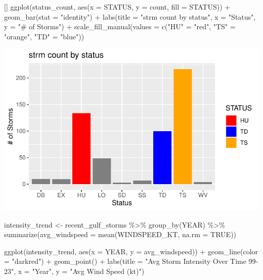\documentclass[12pt,letterpaper]{article}
\newenvironment{Shaded}{\begin{snugshade}}{\end{snugshade}}
\newenvironment{Highlighting}{}{}
\newcommand{\StringTok}[1]{\textcolor[rgb]{0.31,0.60,0.02}{#1}}
\newcommand{\OtherTok}[1]{\textcolor[rgb]{0.56,0.35,0.01}{#1}}
\newcommand{\FunctionTok}[1]{\textcolor[rgb]{0.00,0.00,0.00}{#1}}
\newcommand{\NormalTok}[1]{#1}
\newcommand{\ConstantTok}[1]{\textcolor[rgb]{0.00,0.00,0.00}{#1}}
\newcommand{\SpecialCharTok}[1]{\textcolor[rgb]{0.00,0.00,0.00}{#1}}
\newcommand{\AttributeTok}[1]{\textcolor[rgb]{0.77,0.63,0.00}{#1}}
\begin{document}
\begin{Shaded}
\begin{Highlighting}[]
\FunctionTok{ggplot}\NormalTok{(status\_count, }\FunctionTok{aes}\NormalTok{(}\AttributeTok{x =}\NormalTok{ STATUS, }\AttributeTok{y =}\NormalTok{ count, }\AttributeTok{fill =}\NormalTok{ STATUS)) }\SpecialCharTok{+}
  \FunctionTok{geom\_bar}\NormalTok{(}\AttributeTok{stat =} \StringTok{"identity"}\NormalTok{) }\SpecialCharTok{+}
  \FunctionTok{labs}\NormalTok{(}\AttributeTok{title =} \StringTok{"strm count by status"}\NormalTok{,}
       \AttributeTok{x =} \StringTok{"Status"}\NormalTok{,}
       \AttributeTok{y =} \StringTok{"\# of Storms"}\NormalTok{) }\SpecialCharTok{+}
  \FunctionTok{scale\_fill\_manual}\NormalTok{(}\AttributeTok{values =} \FunctionTok{c}\NormalTok{(}\StringTok{"HU"} \OtherTok{=} \StringTok{"red"}\NormalTok{, }\StringTok{"TS"} \OtherTok{=} \StringTok{"orange"}\NormalTok{, }\StringTok{"TD"} \OtherTok{=} \StringTok{"blue"}\NormalTok{))}
\end{Highlighting}
\end{Shaded}

\includegraphics{GroupTask3_files/figure-pdf/Plots-3.pdf}

\begin{Shaded}
\begin{Highlighting}[]
\NormalTok{intensity\_trend }\OtherTok{\textless{}{-}}\NormalTok{ recent\_gulf\_storms }\SpecialCharTok{\%\textgreater{}\%}
  \FunctionTok{group\_by}\NormalTok{(YEAR) }\SpecialCharTok{\%\textgreater{}\%}
  \FunctionTok{summarize}\NormalTok{(}\AttributeTok{avg\_windspeed =} \FunctionTok{mean}\NormalTok{(WINDSPEED\_KT, }\AttributeTok{na.rm =} \ConstantTok{TRUE}\NormalTok{))}

\FunctionTok{ggplot}\NormalTok{(intensity\_trend, }\FunctionTok{aes}\NormalTok{(}\AttributeTok{x =}\NormalTok{ YEAR, }\AttributeTok{y =}\NormalTok{ avg\_windspeed)) }\SpecialCharTok{+}
  \FunctionTok{geom\_line}\NormalTok{(}\AttributeTok{color =} \StringTok{"darkred"}\NormalTok{) }\SpecialCharTok{+}
  \FunctionTok{geom\_point}\NormalTok{() }\SpecialCharTok{+}
  \FunctionTok{labs}\NormalTok{(}\AttributeTok{title =} \StringTok{"Avg Storm Intensity Over Time 99{-}23"}\NormalTok{,}
       \AttributeTok{x =} \StringTok{"Year"}\NormalTok{,}
       \AttributeTok{y =} \StringTok{"Avg Wind Speed (kt)"}\NormalTok{)}
\end{Highlighting}
\end{Shaded}
\end{document}
